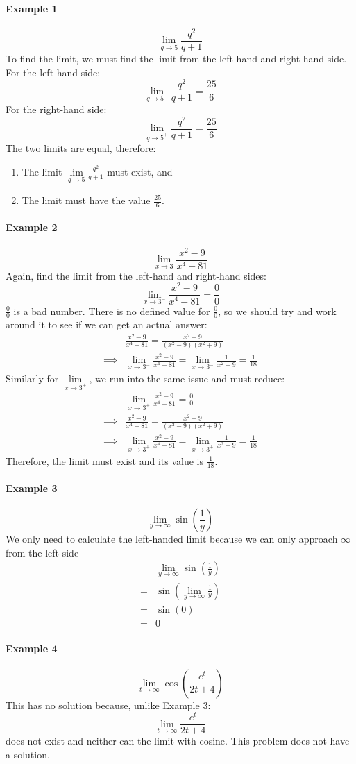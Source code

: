 \documentclass[../revisedMain.tex]{subfiles}
\begin{document}
\paragraph{Example 1} \[\lim\limits_{q\to 5} \frac{q^2}{q+1}\] To find the limit, we must find the limit from the left-hand and right-hand side. For the left-hand side: \[\lim\limits_{q\to 5^-} \frac{q^2}{q+1}=\frac{25}{6}\] For the right-hand side: 
\[\lim\limits_{q\to 5^+} \frac{q^2}{q+1}=\frac{25}{6}\] The two limits are equal, therefore:
\begin{enumerate}\item The limit \(\lim\limits_{q\to 5} \displaystyle\frac{q^2}{q+1}\) must exist, and\item The limit must have the value \(\displaystyle\frac{25}{6}\).\end{enumerate}
\paragraph{Example 2} \[\lim\limits_{x\to 3}\frac{x^2-9}{x^4-81}\] Again, find the limit from the left-hand and right-hand sides: \[\lim\limits_{x\to 3^-}\frac{x^2-9}{x^4-81}=\frac{0}{0}\] \(\displaystyle\frac{0}{0}\) is a bad number. There is no defined value for \(\displaystyle\frac{0}{0}\), so we should try and work around it to see if we can get an actual answer: 
\begin{equation}\begin{split}&\frac{x^2-9}{x^4-81}=\frac{x^2-9}{(x^2-9)(x^2+9)}\\\implies&\lim\limits_{x\to 3^-}\frac{x^2-9}{x^4-81}=\lim_{x\to 3^-}\frac{1}{x^2+9}=\frac{1}{18}\end{split}\end{equation}
Similarly for \(\lim\limits_{x\to 3^+}\), we run into the same issue and must reduce:
\begin{equation}\begin{split}&\lim\limits_{x\to 3^+}\frac{x^2-9}{x^4-81}=\frac{0}{0}\\\implies&\frac{x^2-9}{x^4-81}=\frac{x^2-9}{(x^2-9)(x^2+9)}\\\implies&\lim\limits_{x\to 3^+}\frac{x^2-9}{x^4-81}=\lim_{x\to 3^+}\frac{1}{x^2+9}=\frac{1}{18}\end{split}
\end{equation} Therefore, the limit must exist and its value is \(\displaystyle\frac{1}{18}\).
\paragraph{Example 3} \[\lim_{y\to\infty}\sin\left(\frac{1}{y}\right)\] We only need to calculate the left-handed limit because we can only approach \(\infty\) from the left side 
\begin{equation}\begin{split}&\lim_{y\to\infty}\sin\left(\frac{1}{y}\right)\\=&\sin\left(\lim_{y\to\infty}\frac{1}{y}\right)\\=&\sin(0)\\=&0\end{split}\end{equation}
\paragraph{Example 4} \[\lim_{t\to\infty}\cos\left(\frac{e^t}{2t+4}\right)\] This has no solution because, unlike Example 3: \[\lim_{t\to\infty}\frac{e^t}{2t+4}\] does not exist and neither can the limit with cosine. This problem does not have a solution.
\end{document}
